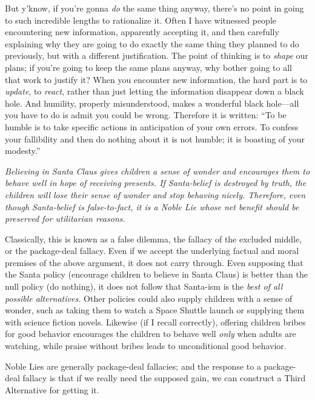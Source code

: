 {
 But y'know, if you're gonna
\textit{do} the same thing anyway, there's no point in
going to such incredible lengths to rationalize it. Often I have
witnessed people encountering new information, apparently accepting it,
and then carefully explaining why they are going to do exactly the same
thing they planned to do previously, but with a different
justification. The point of thinking is to \textit{shape} our plans; if
you're going to keep the same plans anyway, why bother
going to all that work to justify it? When you encounter new
information, the hard part is to \textit{update}, to \textit{react},
rather than just letting the information disappear down a black hole.
And humility, properly misunderstood, makes a wonderful black
hole---all you have to do is admit you could be wrong. Therefore it is
written: ``To be humble is to take specific actions in
anticipation of your own errors. To confess your fallibility and then
do nothing about it is not humble; it is boasting of your
modesty.''}

\myendsectiontext


\bigskip



{
 \textit{Believing in Santa Claus gives children a sense of wonder
and encourages them to behave well in hope of receiving presents. If
Santa-belief is destroyed by truth, the children will lose their sense
of wonder and stop behaving nicely. Therefore, even though Santa-belief
is false-to-fact, it is a Noble Lie whose net benefit should be
preserved for utilitarian reasons.}}

{
 Classically, this is known as a false dilemma, the fallacy of the
excluded middle, or the package-deal fallacy. Even if we accept the
underlying factual and moral premises of the above argument, it does
not carry through. Even supposing that the Santa policy (encourage
children to believe in Santa Claus) is better than the null policy (do
nothing), it does not follow that Santa-ism is the \textit{best of all
possible alternatives.} Other policies could also supply children with
a sense of wonder, such as taking them to watch a Space Shuttle launch
or supplying them with science fiction novels. Likewise (if I recall
correctly), offering children bribes for good behavior encourages the
children to behave well \textit{only} when adults are watching, while
praise without bribes leads to unconditional good behavior.}

{
 Noble Lies are generally package-deal fallacies; and the response
to a package-deal fallacy is that if we really need the supposed gain,
we can construct a Third Alternative for getting it.}

